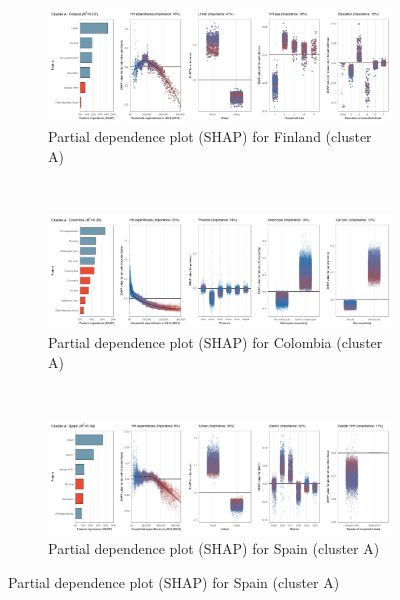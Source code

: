 \begin{figure}[ht!]\ContinuedFloat
    \centering
   \begin{subfigure}[b]{\textwidth}
         \centering
         \caption{Partial dependence plot (SHAP) for Finland (cluster A)}
         \label{fig:5b_FIN}
         \includegraphics[width=\textwidth]{Figure 5b/Figure_5b_FIN}         
     \end{subfigure}
    \\
    \vspace{0.5cm}
   \begin{subfigure}[b]{\textwidth}
         \centering
         \caption{Partial dependence plot (SHAP) for Colombia (cluster A)}
         \label{fig:5b_COL}
         \includegraphics[width=\textwidth]{Figure 5b/Figure_5b_COL}         
     \end{subfigure}
    \\
    \vspace{0.5cm}
   \begin{subfigure}[b]{\textwidth}
         \centering
         \caption{Partial dependence plot (SHAP) for Spain (cluster A)}
         \label{fig:5b_ESP}
         \includegraphics[width=\textwidth]{Figure 5b/Figure_5b_ESP}

\end{subfigure}
\end{figure}
